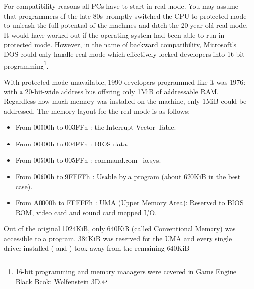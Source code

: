 \documentclass[book.tex]{subfiles}
\begin{document}
\par
For compatibility reasons all PCs have to start in real mode. You may assume that programmers
of the late 80s promptly switched the CPU to protected mode to unleash the full
potential of the machines and ditch the 20-year-old real mode. It would have worked out if the operating system had been able to run in protected mode.
However, in the name of backward compatibility, Microsoft's DOS could only handle real
mode which effectively locked developers into 16-bit programming\footnote{16-bit programming and memory managers were covered in Game Engine Black Book: Wolfenstein 3D.}.\\


\par
  With protected mode unavailable, 1990 developers programmed like it was 1976: with a 20-bit-wide address bus offering only 1MiB of addressable RAM. Regardless how much memory was installed on the machine, only 1MiB could be addressed. The memory layout for the real mode is as follows:
\begin{itemize}
\item From 00000h to 003FFh : the Interrupt Vector Table.
\item From 00400h to 004FFh : BIOS data.
\item From 00500h to 005FFh : command.com+io.sys.
\item From 00600h to 9FFFFh : Usable by a program (about 620KiB in the best case). 
\item From A0000h to FFFFFh : UMA (Upper Memory Area): Reserved to BIOS ROM, video card and sound card mapped I/O.
\end{itemize}


\bigskip
Out of the original 1024KiB, only 640KiB (called Conventional Memory) was accessible to a program. 384KiB was reserved for the UMA and every single driver installed ( and ) took away from the remaining 640KiB.\\
\end{document}

